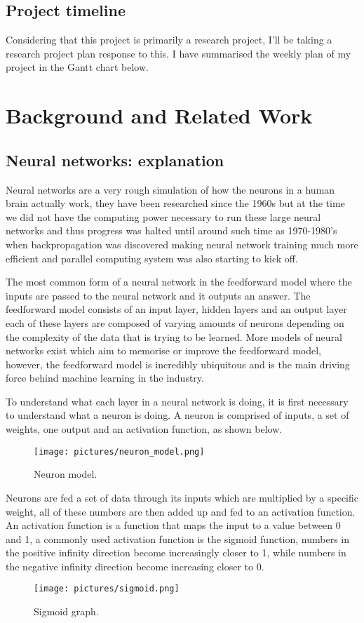 \documentclass[a4paper,oneside,phd,etd]{BYUPhys}
\begin{document}
\section{Project timeline}
Considering that this project is primarily a research project, I'll be taking a research project plan response to this. I have summarised the weekly plan of my project in the Gantt chart below.

\chapter{Background and Related Work}
\label{chap:LitReview}

\section{Neural networks: explanation}
Neural networks are a very rough simulation of how the neurons in a human brain actually work\cite{neural-network-intro}, they have been researched since the 1960s\cite{neural-network-history} but at the time we did not have the computing power necessary to run these large neural networks and thus progress was halted until around such time as 1970-1980's when backpropagation was discovered making neural network training much more efficient and parallel computing system was also starting to kick off.

The most common form of a neural network in the feedforward model where the inputs are passed to the neural network and it outputs an answer. The feedforward model consists of an input layer, hidden layers and an output layer each of these layers are composed of varying amounts of neurons depending on the complexity of the data that is trying to be learned. More models of neural networks exist which aim to memorise or improve the feedforward model, however, the feedforward model is incredibly ubiquitous and is the main driving force behind machine learning in the industry. 

To understand what each layer in a neural network is doing, it is first necessary to understand what a neuron is doing. A neuron is comprised of inputs, a set of weights, one output and an activation function, as shown below.
\begin{figure}[H]
\centering
\texttt{[image: pictures/neuron\_model.png]}
\caption{Neuron model\cite{fig:neuron_model}.}
\label{fig:neuron_model}
\end{figure}

Neurons are fed a set of data through its inputs which are multiplied by a specific weight, all of these numbers are then added up and fed to an activation function. An activation function is a function that maps the input to a value between 0 and 1, a commonly used activation function is the sigmoid function, numbers in the positive infinity direction become increasingly closer to 1, while numbers in the negative infinity direction become increasing closer to 0.
\begin{figure}[H]
\centering
\texttt{[image: pictures/sigmoid.png]}
\caption{Sigmoid graph\cite{fig:sigmoid}.}
\label{fig:sigmoid}
\end{figure}
\end{document}
